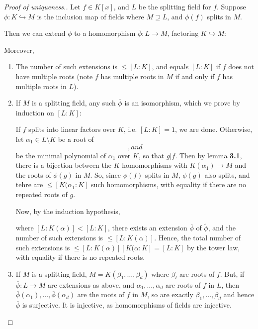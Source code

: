 \documentclass[a4paper, 10pt, twocolumn]{amsart}
\begin{document}
\begin{proof}[Proof of uniqueness.]
Let $f\in K[x]$, and $L$ be the splitting field for $f$. Suppose $\phi:K\hookrightarrow M$ is the inclusion map of fields where $M\supseteq L$, and $\phi(f)$ splits in $M$.

Then we can extend $\phi$ to a homomorphism  $\overline{\phi}:L\rightarrow M$, factoring $K\hookrightarrow M$:
\begin{center}
\end{center}
Moreover,
\begin{enumerate}
\item The number of such extensions is $\leq [L:K]$, and equals $[L:K]$ if $f$ does not have multiple roots (note $f$ has multiple roots in $M$ if and only if $f$ has multiple roots in $L$).
\item If $M$ is a splitting field, any such $\overline{\phi}$ is an isomorphism, which we prove by induction on $[L:K]$:

If $f$ splits into linear factors over $K$, i.e. $[L:K] = 1$, we are done. Otherwise, let $\alpha_1 \in L\setminus K$ be a root of $$, and $$ be the minimal polynomial of $\alpha_1$ over $K$, so that $g|f$. Then by lemma \textbf{3.1}, there is a bijection between the $K$-homomorphisms with $K(\alpha_1) \rightarrow M$ and the roots of $\phi(g)$ in $M$. So, since $\phi(f)$ splits in $M$, $\phi(g)$ also splits, and tehre are $\leq [K(\alpha_1:K]$ such homomorphisms, with equality if there are no repeated roots of $g$.

Now, by the induction hypothesis, 
\begin{center}
\end{center}
where $[L:K(\alpha)] < [L:K]$, there exists an extension $\overline{\phi}$ of $\tilde{\phi}$, and the number of such extensions is $\leq [L:K(\alpha)]$. Hence, the total number of such extensions is $\leq [L:K(\alpha)][K(\alpha:K] = [L:K]$ by the tower law, with equality if there is no repeated roots.

\item If $M$ is a splitting field, $M = K(\beta_1, \ldots, \beta_d)$ where $\beta_l$ are roots of $f$. But, if $\overline{\phi}:L\rightarrow M$ are extensions as above, and $\alpha_1, \ldots, \alpha_d$ are roots of $f$ in $L$, then $\overline{\phi}(\alpha_1), \ldots, \overline{\phi}(\alpha_d)$ are the roots of $f$ in $M$, so are exactly $\beta_1, \ldots, \beta_d$ and hence $\overline{\phi}$ is surjective. It is injective, as homomorphisms of fields are injective.
\end{enumerate}
\end{proof}
\end{document}

